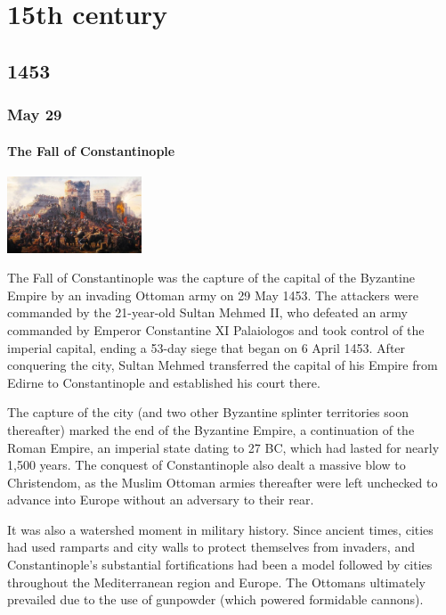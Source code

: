 \documentclass[11pt]{report}
\begin{document}
										
	
\part{15th century}

\chapter{1453}
\section{May 29}
\subsection{The Fall of Constantinople}
\vspace{2mm}\begin{center}\includegraphics[width=4cm]{./img/fallofConstantpl.jpg}\end{center}
The Fall of Constantinople was the capture of the capital of the Byzantine Empire by an invading Ottoman army on 29 May 1453. The attackers were commanded by the 21-year-old Sultan Mehmed II, who defeated an army commanded by Emperor Constantine XI Palaiologos and took control of the imperial capital, ending a 53-day siege that began on 6 April 1453. After conquering the city, Sultan Mehmed transferred the capital of his Empire from Edirne to Constantinople and established his court there.

The capture of the city (and two other Byzantine splinter territories soon thereafter) marked the end of the Byzantine Empire, a continuation of the Roman Empire, an imperial state dating to 27 BC, which had lasted for nearly 1,500 years. The conquest of Constantinople also dealt a massive blow to Christendom, as the Muslim Ottoman armies thereafter were left unchecked to advance into Europe without an adversary to their rear.

It was also a watershed moment in military history. Since ancient times, cities had used ramparts and city walls to protect themselves from invaders, and Constantinople's substantial fortifications had been a model followed by cities throughout the Mediterranean region and Europe. The Ottomans ultimately prevailed due to the use of gunpowder (which powered formidable cannons).
\end{document}
